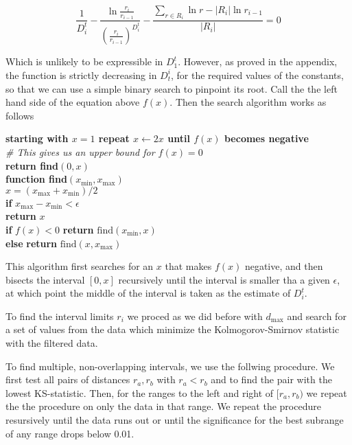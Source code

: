 \documentclass[11pt]{article}
\begin{document}
\[
\frac{1}{D^t_i} - \frac{\ln \frac{r_i}{r_{i-1}}}{(\frac{r_i}{r_{i-1}})^{D^t_i}} - \frac{\sum_{r \in R_i}\ln r - |R_i| \ln r_{i-1}}{|R_i|}= 0
\]

Which is unlikely to be expressible in $D^t_1$. However, as proved in the appendix, the function is strictly decreasing in $D^i_t$, for the required values of the constants, so that we can use a simple binary search to pinpoint its root. Call the the left hand side of the equation above $f(x)$. Then the search algorithm works as follows

\begin{pseudo}[h]
	\textbf{starting with $x = 1$ repeat $x \leftarrow 2x$ until $f(x)$ becomes negative}  \\
	\hspace*{5mm}\textit{\# This gives us an upper bound for $f(x) = 0$}\\
	\textbf{return find}$(0, x)$ \\
	
	\textbf{function find}$(x_{\min}, x_{\max})$ \\
	\hspace*{5mm} $x = (x_{\max} + x_{\min})/2$ \\
	\hspace*{5mm} \textbf{if} $x_{\max} - x_{\min} < \epsilon$ \\
	\hspace*{10mm} \textbf{return} $x$\\
	\hspace*{5mm} \textbf{if} $f(x) < 0$
	\textbf{return} $\mbox{find}(x_{\min}, x)$ \\ 
	\hspace*{5mm} \textbf{else} 
 	\textbf{return} $\mbox{find}(x, x_{\max})$ \\	
\end{pseudo}

This algorithm first searches for an $x$ that makes $f(x)$ negative, and then bisects the interval $[0, x]$ recursively until the interval is smaller tha a given $\epsilon$, at which point the middle of the interval is taken as the estimate of $D_i^t$.

To find the interval limits $r_i$ we proced as we did before with $d_{\max}$ and search for a set of values from the data which minimize the Kolmogorov-Smirnov statistic with the filtered data.

To find multiple, non-overlapping intervals, we use the follwing procedure. We first test all pairs of distances $r_a, r_b$ with $r_a < r_b$ and to find the pair with the lowest KS-statistic. Then, for the ranges to the left and right of $[r_a, r_b)$ we repeat the the procedure on only the data in that range. We repeat the procedure resursively until the data runs out or until the significance for the best subrange of any range drops below 0.01.
\end{document}
